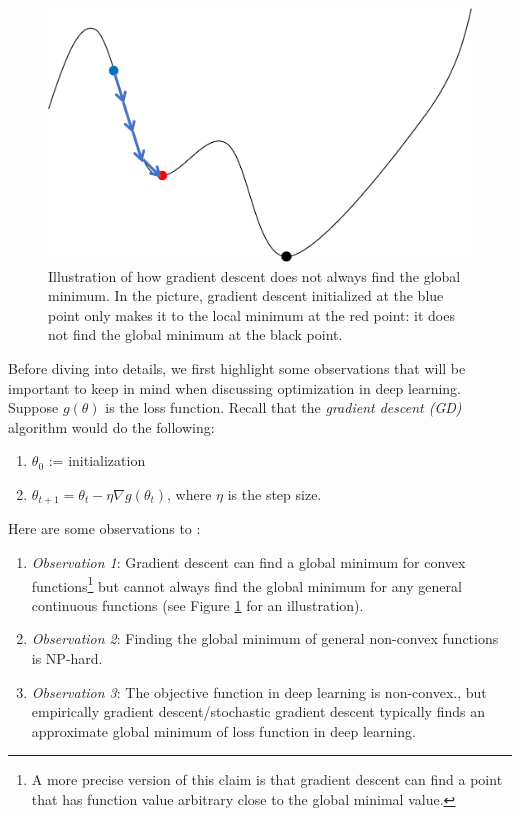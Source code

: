 \begin{figure}[ht!]
    \centering
    \includegraphics[scale = 0.3]{figures/gradient_descent.png}
    \caption{Illustration of how gradient descent does not always find the global minimum. In the picture, gradient descent initialized at the blue point only makes it to the local minimum at the red point: it does not find the global minimum at the black point.}
    \label{lec10:fig:gradient_descent}
\end{figure}
Before diving into details, we first highlight some observations that will be important to keep in mind when discussing optimization in deep learning. Suppose $g(\theta)$ is the loss function. Recall that the \textit{gradient descent (GD)} algorithm would do the following:
\begin{enumerate}
    \item $\theta_0$ := initialization
    \item $\theta_{t + 1} = \theta_t - \eta\nabla g(\theta_t)$, where $\eta$ is the step size.
\end{enumerate}
Here are some observations to :
\begin{enumerate}
    \item[] \textit{Observation 1}: Gradient descent can find a global minimum for convex functions\footnote{A more precise version of this claim is that gradient descent can find a point that has function value arbitrary close to the global minimal value. } but cannot always find the global minimum for any general continuous functions (see Figure \ref{lec10:fig:gradient_descent} for an illustration).
    \item[] \textit{Observation 2}: Finding the global minimum of general non-convex functions is NP-hard.
    \item[] \textit{Observation 3}: The objective function in deep learning is non-convex., but empirically gradient descent/stochastic gradient descent typically finds an approximate global minimum of loss function in deep learning.
\end{enumerate}


